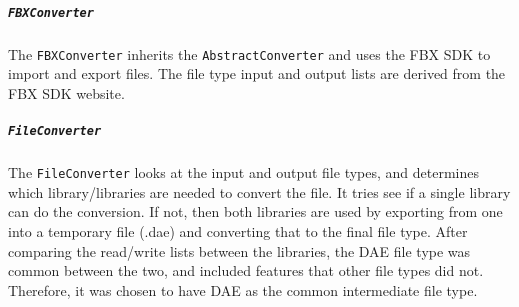     \subparagraph{\texttt{FBXConverter}}
    \hfill \break
    The \texttt{FBXConverter} inherits the \texttt{AbstractConverter} and uses the FBX SDK to import and export files.
    The file type input and output lists are derived from the FBX SDK website.

    \subparagraph{\texttt{FileConverter}}
    \hfill \break
    The \texttt{FileConverter} looks at the input and output file types, and determines which library/libraries are needed to convert the file.
    It tries see if a single library can do the conversion.  If not, then both libraries are used by exporting from one into a 
    temporary file (.dae) and converting that to the final file type. After comparing the read/write lists between the libraries,
    the DAE file type was common between the two, and included features that other file types did not.  Therefore, it was chosen
    to have DAE as the common intermediate file type.
